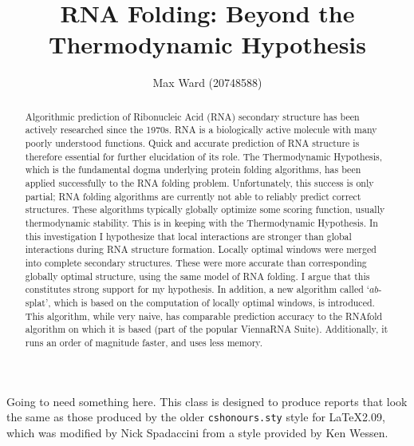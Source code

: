 \documentclass{cshonours}
\title{RNA Folding: Beyond the Thermodynamic Hypothesis}
\author{Max Ward (20748588)}
\begin{document}
\maketitle

\begin{abstract}
Algorithmic prediction of Ribonucleic Acid (RNA) secondary structure has been actively researched since the 1970s. RNA is a biologically active molecule with many poorly understood functions. Quick and accurate prediction of RNA structure is therefore essential for further elucidation of its role. The Thermodynamic Hypothesis, which is the fundamental dogma underlying protein folding algorithms, has been applied successfully to the RNA folding problem. Unfortunately, this success is only partial; RNA folding algorithms are currently not able to reliably predict correct structures. These algorithms typically globally optimize some scoring function, usually thermodynamic stability. This is in keeping with the Thermodynamic Hypothesis. In this investigation I hypothesize that local interactions are stronger than global interactions during RNA structure formation. Locally optimal windows were merged into complete secondary structures. These were more accurate than corresponding globally optimal structure, using the same model of RNA folding. I argue that this constitutes strong support for my hypothesis. In addition, a new algorithm called `$ab$-splat', which is based on the computation of locally optimal windows, is introduced. This algorithm, while very naive, has comparable prediction accuracy to the RNAfold algorithm on which it is based (part of the popular ViennaRNA Suite). Additionally, it runs an order of magnitude faster, and uses less memory.
\end{abstract}

\begin{acknowledgements}
Going to need something here.
This class is designed to produce reports that look
the same as those produced by the older {\tt cshonours.sty} style for
\LaTeX 2.09, which was modified by Nick Spadaccini from a style
provided by Ken Wessen.
\end{acknowledgements}

\tableofcontents
\listoftables  %
\listoffigures  %
\end{document}
